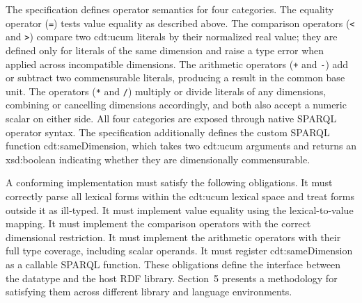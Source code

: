 The specification defines operator semantics for four categories. The equality operator
(\texttt{=}) tests value equality as described above. The comparison operators (\texttt{<}
and \texttt{>}) compare two \textsf{cdt:ucum} literals by their normalized real value; they are
defined only for literals of the same dimension and raise a type error when applied across
incompatible dimensions. The arithmetic operators (\texttt{+} and \texttt{-}) add or subtract
two commensurable literals, producing a result in the common base unit. The operators
(\texttt{*} and \texttt{/}) multiply or divide literals of any dimensions, combining or
cancelling dimensions accordingly, and both also accept a numeric scalar on either side. All
four categories are exposed through native SPARQL operator syntax. The specification
additionally defines the custom SPARQL function \textsf{cdt:sameDimension}, which takes two
\textsf{cdt:ucum} arguments and returns an \textsf{xsd:boolean} indicating whether they are
dimensionally commensurable.

A conforming implementation must satisfy the following obligations. It must correctly parse
all lexical forms within the \textsf{cdt:ucum} lexical space and treat forms outside it as
ill-typed. It must implement value equality using the lexical-to-value mapping. It must
implement the comparison operators with the correct dimensional restriction. It must implement
the arithmetic operators with their full type coverage, including scalar operands. It must
register \textsf{cdt:sameDimension} as a callable SPARQL function. These obligations define
the interface between the datatype and the host RDF library. Section~5 presents a methodology
for satisfying them across different library and language environments.